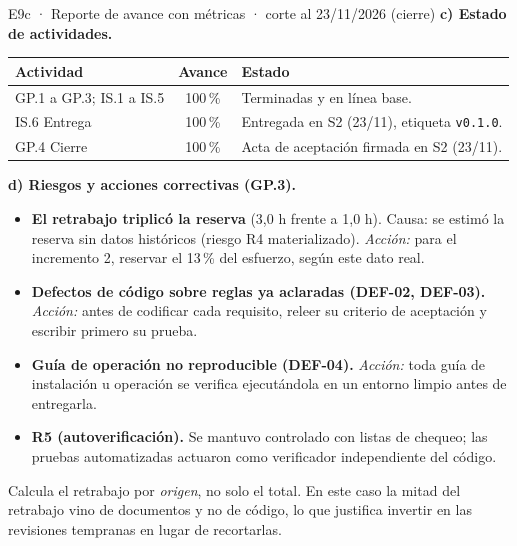 \documentclass[11pt,a4paper]{article}
\newcommand{\cod}[1]{\texttt{\small #1}}
\begin{document}
\begin{evidencia}{E9c · Reporte de avance con métricas · corte al 23/11/2026 (cierre)}
\vspace{0.3cm}
\textbf{c) Estado de actividades.}

\begin{tabularx}{\linewidth}{@{}l c L@{}}
\toprule
\textbf{Actividad} & \textbf{Avance} & \textbf{Estado} \\
\midrule
GP.1 a GP.3; IS.1 a IS.5 & 100\,\% & Terminadas y en línea base. \\
IS.6 Entrega & 100\,\% & Entregada en S2 (23/11), etiqueta \cod{v0.1.0}. \\
GP.4 Cierre & 100\,\% & Acta de aceptación firmada en S2 (23/11). \\
\bottomrule
\end{tabularx}

\vspace{0.3cm}
\textbf{d) Riesgos y acciones correctivas (GP.3).}
\begin{itemize}
  \item \textbf{El retrabajo triplicó la reserva} (3,0 h frente a 1,0 h). Causa: se estimó la reserva sin datos históricos (riesgo R4 materializado). \emph{Acción:} para el incremento 2, reservar el 13\,\% del esfuerzo, según este dato real.
  \item \textbf{Defectos de código sobre reglas ya aclaradas (DEF-02, DEF-03).} \emph{Acción:} antes de codificar cada requisito, releer su criterio de aceptación y escribir primero su prueba.
  \item \textbf{Guía de operación no reproducible (DEF-04).} \emph{Acción:} toda guía de instalación u operación se verifica ejecutándola en un entorno limpio antes de entregarla.
  \item \textbf{R5 (autoverificación).} Se mantuvo controlado con listas de chequeo; las pruebas automatizadas actuaron como verificador independiente del código.
\end{itemize}
\end{evidencia}

\begin{consejo}
Calcula el retrabajo por \emph{origen}, no solo el total. En este caso la mitad del retrabajo vino de documentos y no de código, lo que justifica invertir en las revisiones tempranas en lugar de recortarlas.
\end{consejo}
\end{document}
